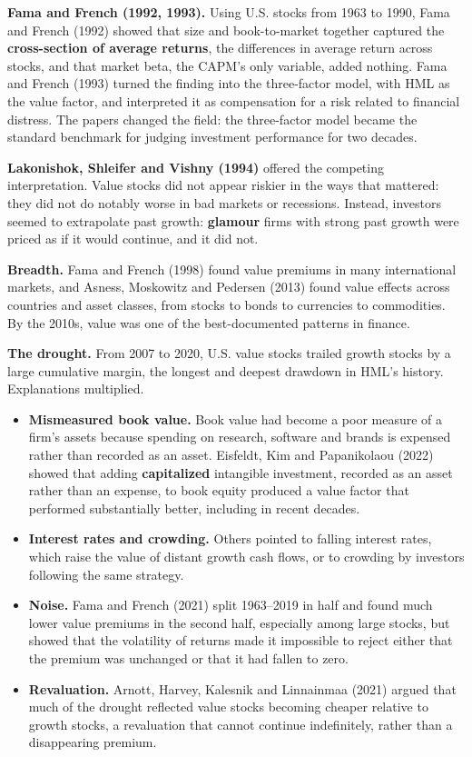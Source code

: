 \textbf{Fama and French (1992, 1993).} Using U.S. stocks from 1963 to 1990, Fama and French (1992) showed that size and book-to-market together captured the \textbf{cross-section of average returns}, the differences in average return across stocks, and that market beta, the CAPM's only variable, added nothing. Fama and French (1993) turned the finding into the three-factor model, with HML as the value factor, and interpreted it as compensation for a risk related to financial distress. The papers changed the field: the three-factor model became the standard benchmark for judging investment performance for two decades.

\textbf{Lakonishok, Shleifer and Vishny (1994)} offered the competing interpretation. Value stocks did not appear riskier in the ways that mattered: they did not do notably worse in bad markets or recessions. Instead, investors seemed to extrapolate past growth: \textbf{glamour} firms with strong past growth were priced as if it would continue, and it did not.

\textbf{Breadth.} Fama and French (1998) found value premiums in many international markets, and Asness, Moskowitz and Pedersen (2013) found value effects across countries and asset classes, from stocks to bonds to currencies to commodities. By the 2010s, value was one of the best-documented patterns in finance.

\textbf{The drought.} From 2007 to 2020, U.S. value stocks trailed growth stocks by a large cumulative margin, the longest and deepest drawdown in HML's history. Explanations multiplied.

\begin{itemize}
  \item \textbf{Mismeasured book value.} Book value had become a poor measure of a firm's assets because spending on research, software and brands is expensed rather than recorded as an asset. Eisfeldt, Kim and Papanikolaou (2022) showed that adding \textbf{capitalized} intangible investment, recorded as an asset rather than an expense, to book equity produced a value factor that performed substantially better, including in recent decades.
  \item \textbf{Interest rates and crowding.} Others pointed to falling interest rates, which raise the value of distant growth cash flows, or to crowding by investors following the same strategy.
  \item \textbf{Noise.} Fama and French (2021) split 1963--2019 in half and found much lower value premiums in the second half, especially among large stocks, but showed that the volatility of returns made it impossible to reject either that the premium was unchanged or that it had fallen to zero.
  \item \textbf{Revaluation.} Arnott, Harvey, Kalesnik and Linnainmaa (2021) argued that much of the drought reflected value stocks becoming cheaper relative to growth stocks, a revaluation that cannot continue indefinitely, rather than a disappearing premium.
\end{itemize}

